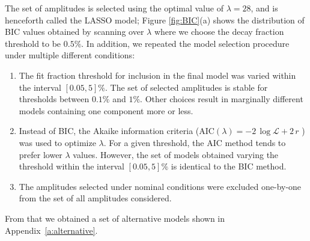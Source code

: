 The set of amplitudes is selected using the optimal value of $\lambda=28$, and is henceforth called the LASSO model; 
Figure \ref{fig:BIC}(a) shows the distribution of BIC values obtained by scanning over $\lambda$
where we choose the decay fraction threshold to be $0.5 \%$.
In addition, we repeated the model selection procedure under multiple different conditions:
\begin{enumerate}
	\item The fit fraction threshold for inclusion in the final model was varied within the interval $[0.05, 5] \%$.
		The set of selected amplitudes is stable for thresholds between $0.1\%$ and $1\%$. 
		Other choices result in marginally different models containing one component more or less.
	\item Instead of BIC, the Akaike information criteria ($\text{AIC}(\lambda) = -2 \, \log  \mathcal L + 2 \, r$ \cite{AIC}) was used to optimize $\lambda$.
		For a given threshold, the AIC method tends to prefer %
		lower $\lambda$ values.
		However, the set of models obtained varying the threshold within the interval $[0.05, 5] \%$
		is identical to the BIC method. 
	\item The amplitudes selected under nominal conditions were excluded one-by-one from the set of all amplitudes considered.  
\end{enumerate}
From that we obtained a set of alternative models shown in Appendix~\ref{a:alternative}.





